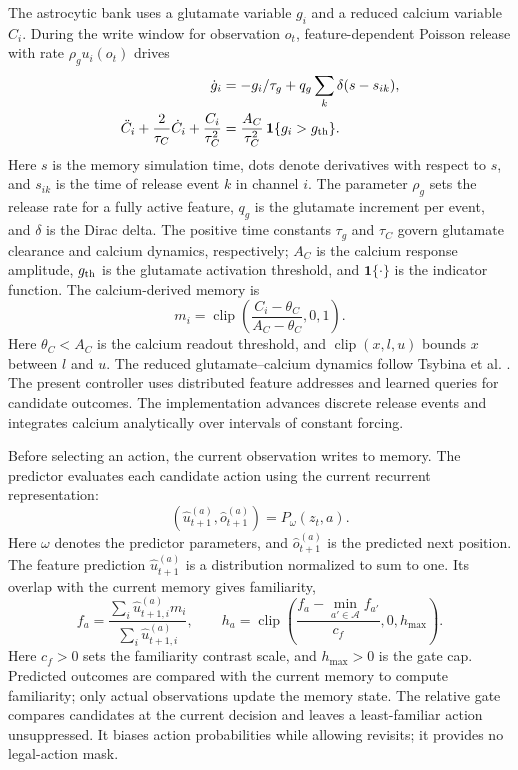 The astrocytic bank uses a glutamate variable $g_i$ and a reduced calcium variable $C_i$. During the write window for observation $o_t$, feature-dependent Poisson release with rate $\rho_g u_i(o_t)$ drives
\begin{align}
 \dot g_i&=-g_i/\tau_g+q_g\sum_k\delta(s-s_{ik}),\\
 \ddot C_i+\frac{2}{\tau_C}\dot C_i+\frac{C_i}{\tau_C^2}
 &=\frac{A_C}{\tau_C^2}\,\mathbf1\{g_i>g_{\rm th}\}.
\end{align}
Here $s$ is the memory simulation time, dots denote derivatives with respect to $s$, and $s_{ik}$ is the time of release event $k$ in channel $i$. The parameter $\rho_g$ sets the release rate for a fully active feature, $q_g$ is the glutamate increment per event, and $\delta$ is the Dirac delta. The positive time constants $\tau_g$ and $\tau_C$ govern glutamate clearance and calcium dynamics, respectively; $A_C$ is the calcium response amplitude, $g_{\rm th}$ is the glutamate activation threshold, and $\mathbf1\{\cdot\}$ is the indicator function. The calcium-derived memory is
\begin{equation}
 m_i=\operatorname{clip}\!\left(\frac{C_i-\theta_C}{A_C-\theta_C},0,1\right).
\end{equation}
Here $\theta_C<A_C$ is the calcium readout threshold, and $\operatorname{clip}(x,l,u)$ bounds $x$ between $l$ and $u$.
The reduced glutamate--calcium dynamics follow Tsybina et al. \cite{tsybina2026}. The present controller uses distributed feature addresses and learned queries for candidate outcomes. The implementation advances discrete release events and integrates calcium analytically over intervals of constant forcing.

Before selecting an action, the current observation writes to memory. The predictor evaluates each candidate action using the current recurrent representation:
\begin{equation}
 (\widehat u^{(a)}_{t+1},\widehat o^{(a)}_{t+1})=P_\omega(z_t,a).
\end{equation}
Here $\omega$ denotes the predictor parameters, and $\widehat o^{(a)}_{t+1}$ is the predicted next position. The feature prediction $\widehat u^{(a)}_{t+1}$ is a distribution normalized to sum to one. Its overlap with the current memory gives familiarity,
\begin{equation}
 f_a=\frac{\sum_i\widehat u_{t+1,i}^{(a)}m_i}{\sum_i\widehat u_{t+1,i}^{(a)}},\qquad
 h_a=\operatorname{clip}\!\left(\frac{f_a-\min_{a'\in\mathcal A} f_{a'}}{c_f},0,h_{\max}\right).
 \label{eq:familiarity}
\end{equation}
Here $c_f>0$ sets the familiarity contrast scale, and $h_{\max}>0$ is the gate cap. Predicted outcomes are compared with the current memory to compute familiarity; only actual observations update the memory state. The relative gate compares candidates at the current decision and leaves a least-familiar action unsuppressed. It biases action probabilities while allowing revisits; it provides no legal-action mask.


